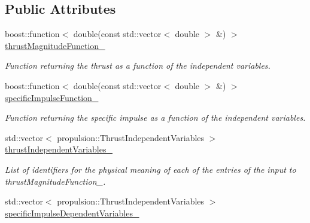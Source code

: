 \subsection*{Public Attributes}
\begin{DoxyCompactItemize}
\item 
boost\+::function$<$ double(const std\+::vector$<$ double $>$ \&) $>$ \hyperlink{classtudat_1_1simulation__setup_1_1ParameterizedThrustMagnitudeSettings_ad3e6e05f43e16ff15d19781663771e62}{thrust\+Magnitude\+Function\+\_\+}\hypertarget{classtudat_1_1simulation__setup_1_1ParameterizedThrustMagnitudeSettings_ad3e6e05f43e16ff15d19781663771e62}{}\label{classtudat_1_1simulation__setup_1_1ParameterizedThrustMagnitudeSettings_ad3e6e05f43e16ff15d19781663771e62}

\begin{DoxyCompactList}\small\item\em Function returning the thrust as a function of the independent variables. \end{DoxyCompactList}\item 
boost\+::function$<$ double(const std\+::vector$<$ double $>$ \&) $>$ \hyperlink{classtudat_1_1simulation__setup_1_1ParameterizedThrustMagnitudeSettings_a331bea3eaa413edc5d9260a686015190}{specific\+Impulse\+Function\+\_\+}\hypertarget{classtudat_1_1simulation__setup_1_1ParameterizedThrustMagnitudeSettings_a331bea3eaa413edc5d9260a686015190}{}\label{classtudat_1_1simulation__setup_1_1ParameterizedThrustMagnitudeSettings_a331bea3eaa413edc5d9260a686015190}

\begin{DoxyCompactList}\small\item\em Function returning the specific impulse as a function of the independent variables. \end{DoxyCompactList}\item 
std\+::vector$<$ propulsion\+::\+Thrust\+Independent\+Variables $>$ \hyperlink{classtudat_1_1simulation__setup_1_1ParameterizedThrustMagnitudeSettings_a655329f1f6c1b2b3bab0ffe38e71608f}{thrust\+Independent\+Variables\+\_\+}\hypertarget{classtudat_1_1simulation__setup_1_1ParameterizedThrustMagnitudeSettings_a655329f1f6c1b2b3bab0ffe38e71608f}{}\label{classtudat_1_1simulation__setup_1_1ParameterizedThrustMagnitudeSettings_a655329f1f6c1b2b3bab0ffe38e71608f}

\begin{DoxyCompactList}\small\item\em List of identifiers for the physical meaning of each of the entries of the input to thrust\+Magnitude\+Function\+\_\+. \end{DoxyCompactList}\item 
std\+::vector$<$ propulsion\+::\+Thrust\+Independent\+Variables $>$ \hyperlink{classtudat_1_1simulation__setup_1_1ParameterizedThrustMagnitudeSettings_a441cde95f875aee0ace63be55d6d4d86}{specific\+Impulse\+Dependent\+Variables\+\_\+}\hypertarget{classtudat_1_1simulation__setup_1_1ParameterizedThrustMagnitudeSettings_a441cde95f875aee0ace63be55d6d4d86}{}\label{classtudat_1_1simulation__setup_1_1ParameterizedThrustMagnitudeSettings_a441cde95f875aee0ace63be55d6d4d86}


\end{DoxyCompactItemize}

